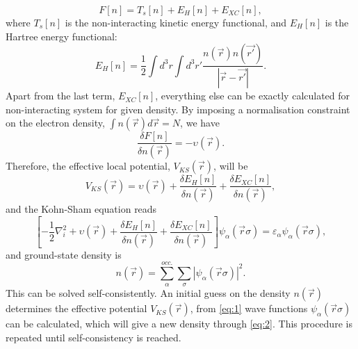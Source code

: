 \begin{equation}
F[n]=T_s[n]+E_H[n]+E_{XC}[n],
\end{equation}
where $T_s[n]$ is the non-interacting kinetic energy functional, and $E_H[n]$ is the Hartree energy functional:
\begin{equation}
E_H[n]=\frac{1}{2}\int d^3r\int d^3r\prime\frac{n(\vec{r})n(\vec{r\prime})}{|\vec{r}-\vec{r\prime}|}.
\end{equation}
Apart from the last term, $E_{XC}[n]$, everything else can be exactly calculated for non-interacting system for given density. By imposing a normalisation constraint on the electron density, $\int n(\vec{r})d\vec{r}=N$, we have
\begin{equation}
\frac{\delta F[n]}{\delta n(\vec{r})}=-\upsilon(\vec{r}).
\end{equation}
Therefore, the effective local potential, $V_{KS}(\vec{r})$, will be
\begin{equation}
V_{KS}(\vec{r})=\upsilon(\vec{r})+\frac{\delta E_H[n]}{\delta n(\vec{r})}+\frac{\delta E_{XC}[n]}{\delta n(\vec{r})},
\end{equation}
and the Kohn-Sham equation reads
\begin{equation}\label{eq:1}
\left[ -\frac{1}{2}\nabla_i^2+\upsilon(\vec{r})+\frac{\delta E_H[n]}{\delta n(\vec{r})}+\frac{\delta E_{XC}[n]}{\delta n(\vec{r})}\right]\mathit{\psi}_\alpha(\vec{r}\sigma)=\varepsilon_\alpha\mathit{\psi}_\alpha(\vec{r}\sigma),
\end{equation}
and ground-state density is 
\begin{equation}\label{eq:2}
n(\vec{r})=\sum_\alpha^{occ.}\sum_\sigma|\mathit{\psi}_\alpha(\vec{r}\sigma)|^2.
\end{equation}
This can be solved self-consistently. An initial guess on the density $n(\vec{r})$ determines the effective potential $V_{KS}(\vec{r})$, from \autoref{eq:1} wave functions $\mathit{\psi}_\alpha(\vec{r}\sigma)$ can be calculated, which will give a new density through \autoref{eq:2}. This procedure is repeated until self-consistency is reached. 
